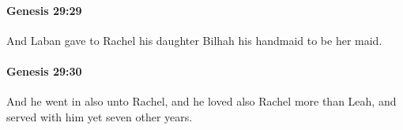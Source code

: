 		\paragraph{Genesis 29:29} %
			\label{GENESIS-29-29}

			And Laban gave to Rachel his daughter Bilhah his handmaid to be her maid.


		\paragraph{Genesis 29:30} %
			\label{GENESIS-29-30}

			And he went in also unto Rachel, and he loved also Rachel more than Leah, and served with him yet seven other years.


